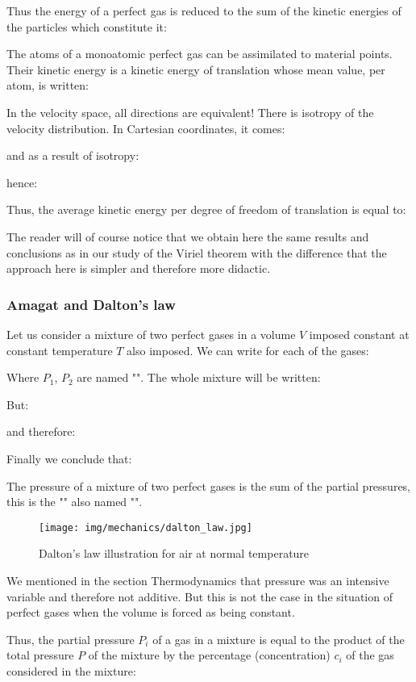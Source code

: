 	Thus the energy of a perfect gas is reduced to the sum of the kinetic energies of the particles which constitute it:
	
	The atoms of a monoatomic perfect gas can be assimilated to material points. Their kinetic energy is a kinetic energy of translation whose mean value, per atom, is written:
	
	In the velocity space, all directions are equivalent! There is isotropy of the velocity distribution. In Cartesian coordinates, it comes:
	
	and as a result of isotropy:
	
	hence:
	
	Thus, the average kinetic energy per degree of freedom of translation is equal to:
	
	The reader will of course notice that we obtain here the same results and conclusions as in our study of the Viriel theorem with the difference that the approach here is simpler and therefore more didactic. 
	
	\subsubsection{Amagat and Dalton's law}
	Let us consider a mixture of two perfect gases in a volume $V$ imposed constant at constant temperature $T$ also imposed. We can write for each of the gases:
	
	Where $P_1$, $P_2$ are named "". The whole mixture will be written:
	
	But:
	
	and therefore:
	
	Finally we conclude that:
	
	The pressure of a mixture of two perfect gases is the sum of the partial pressures, this is the "" also named "".
	\begin{figure}[H]
		\centering
		\texttt{[image: img/mechanics/dalton\_law.jpg]}
		\caption{Dalton's law illustration for air at normal temperature}
	\end{figure}
	\begin{tcolorbox}[title=Remark,colframe=black,arc=10pt]
	We mentioned in the section Thermodynamics that pressure was an intensive variable and therefore not additive. But this is not the case in the situation of perfect gases when the volume is forced as being constant.
	\end{tcolorbox}
	Thus, the partial pressure $P_i$ of a gas in a mixture is equal to the product of the total pressure $P$ of the mixture by the percentage (concentration) $c_i$ of the gas considered in the mixture:
	
